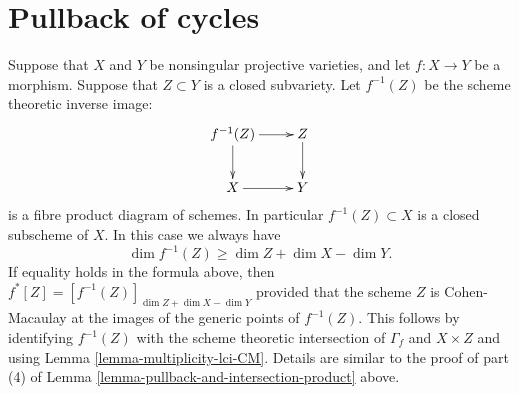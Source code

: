 \documentclass{stacks-project}
\theoremstyle{plain}
\theoremstyle{definition}
\theoremstyle{remark}
\numberwithin{equation}{subsection}
\begin{document}
\section{Pullback of cycles}
\label{section-pullback-cycles}

\noindent
Suppose that $X$ and $Y$ be nonsingular
projective varieties, and let $f : X \to Y$ be a morphism.
Suppose that $Z \subset Y$ is a closed subvariety. Let $f^{-1}(Z)$
be the scheme theoretic inverse image:
$$
\xymatrix{
f^{-1}(Z) \ar[r] \ar[d] & Z \ar[d] \\
X \ar[r] & Y
}
$$
is a fibre product diagram of schemes. In particular $f^{-1}(Z) \subset X$
is a closed subscheme of $X$. In this case we always have
$$
\dim f^{-1}(Z) \geq \dim Z + \dim X - \dim Y.
$$
If equality holds in the formula above, then
$f^*[Z] = [f^{-1}(Z)]_{\dim Z + \dim X - \dim Y}$
provided that the scheme $Z$ is Cohen-Macaulay at the images
of the generic points of $f^{-1}(Z)$. This follows by identifying
$f^{-1}(Z)$ with the scheme theoretic intersection of $\Gamma_f$
and $X \times Z$ and using Lemma \ref{lemma-multiplicity-lci-CM}.
Details are similar to the proof of part (4) of
Lemma \ref{lemma-pullback-and-intersection-product} above.









\end{document}
